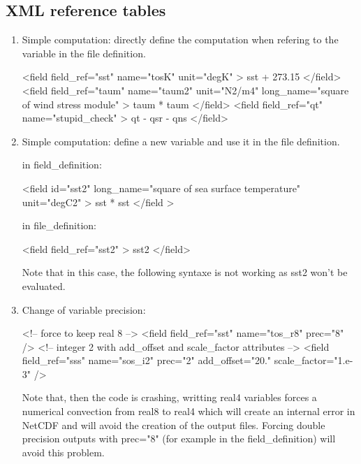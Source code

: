 \documentclass[../tex_main/NEMO_manual]{subfiles}
\begin{document}
\subsection{XML reference tables}
\label{subsec:IOM_xmlref}

\begin{enumerate}
\item Simple computation: directly define the computation when refering to the variable in 
the file definition.

\begin{xmllines}
<field field_ref="sst"  name="tosK"  unit="degK" > sst + 273.15 </field>
<field field_ref="taum" name="taum2" unit="N2/m4" long_name="square of wind stress module" >	taum * taum </field>
<field field_ref="qt"   name="stupid_check" > qt - qsr - qns </field>
\end{xmllines}

\item Simple computation: define a new variable and use it in the file definition.

in field\_definition:

\begin{xmllines}
<field id="sst2" long_name="square of sea surface temperature" unit="degC2" >  sst * sst </field >
\end{xmllines}

in file\_definition:

\begin{xmllines}
<field field_ref="sst2" > sst2 </field>
\end{xmllines}

Note that in this case, the following syntaxe  is not working as 
sst2 won't be evaluated.

\item Change of variable precision:

\begin{xmllines}
<!-- force to keep real 8 -->
<field field_ref="sst" name="tos_r8" prec="8" />
<!-- integer 2  with add_offset and scale_factor attributes -->
<field field_ref="sss" name="sos_i2" prec="2" add_offset="20." scale_factor="1.e-3" />
\end{xmllines}

Note that, then the code is crashing, writting real4 variables forces a numerical convection from 
real8 to real4 which will create an internal error in NetCDF and will avoid the creation of 
the output files.
Forcing double precision outputs with prec="8" (for example in the field\_definition) will 
avoid this problem.


\end{enumerate}
\end{document}
